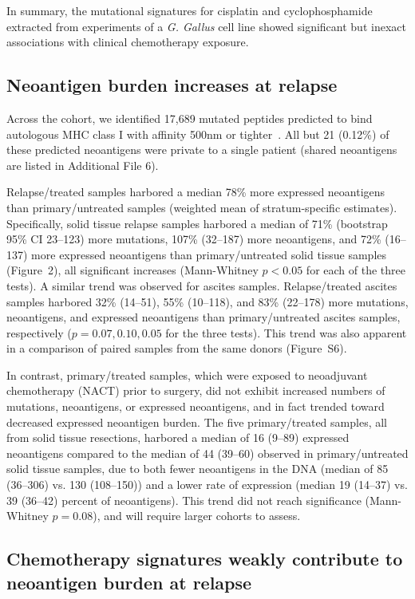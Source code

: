 \documentclass[linenumbers]{bmcart}
\begin{document}
In summary, the mutational signatures for cisplatin and cyclophosphamide extracted from experiments of a \textit{G. Gallus} cell line showed significant but inexact associations with clinical chemotherapy exposure. 


\subsection*{Neoantigen burden increases at relapse}

Across the cohort, we identified 17,689 mutated peptides predicted to bind autologous MHC class I with affinity 500nm or tighter~\cite{Sette1994}. All but 21 (0.12\%) of these predicted neoantigens were private to a single patient (shared neoantigens are listed in Additional File 6).

Relapse/treated samples harbored a median 78\% more expressed neoantigens than primary/untreated samples (weighted mean of stratum-specific estimates). Specifically, solid tissue relapse samples harbored a median of 71\% (bootstrap 95\% CI 23--123) more mutations, 107\% (32--187) more neoantigens, and 72\% (16--137) more expressed neoantigens than primary/untreated solid tissue samples (Figure~2), all significant increases (Mann-Whitney $p < 0.05$ for each of the three tests). A similar trend was observed for ascites samples. Relapse/treated ascites samples harbored 32\% (14--51), 55\% (10--118), and 83\% (22--178) more mutations, neoantigens, and expressed neoantigens than primary/untreated ascites samples, respectively ($p=0.07, 0.10, 0.05$ for the three tests). This trend was also apparent in a comparison of paired samples from the same donors (Figure~S6).

In contrast, primary/treated samples, which were exposed to neoadjuvant chemotherapy (NACT) prior to surgery, did not exhibit increased numbers of mutations, neoantigens, or expressed neoantigens, and in fact trended toward decreased expressed neoantigen burden. The five primary/treated samples, all from solid tissue resections, harbored a median of 16 (9--89) expressed neoantigens compared to the median of 44 (39--60) observed in primary/untreated solid tissue samples, due to both fewer neoantigens in the DNA (median of 85 (36--306) vs. 130 (108--150)) and a lower rate of expression (median 19 (14--37) vs. 39 (36--42) percent of neoantigens). This trend did not reach significance (Mann-Whitney $p=0.08$), and will require larger cohorts to assess.

\subsection*{Chemotherapy signatures weakly contribute to neoantigen burden at relapse}
\end{document}
